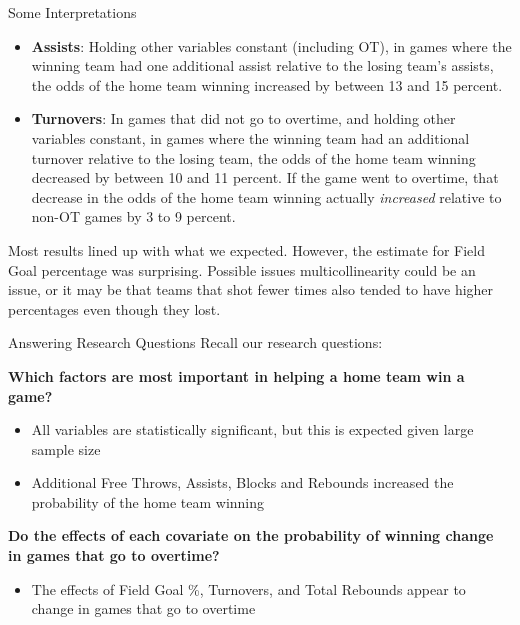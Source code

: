\documentclass{beamer}
\begin{document}
\begin{frame}{Some Interpretations}
 
\begin{itemize}
	\item \textbf{Assists}: Holding other variables constant (including OT), in games where the winning team had one additional assist relative to the losing team's assists, the odds of the home team winning increased by between 13 and 15 percent. 
	\item \textbf{Turnovers}: In games that did not go to overtime, and holding other variables constant, in games where the winning team had an additional turnover relative to the losing team, the odds of the home team winning decreased by between 10 and 11 percent. If the game went to overtime, that decrease in the odds of the home team winning actually \textit{increased} relative to non-OT games by 3 to 9 percent. 
	

\end{itemize}
Most results lined up with what we expected. However, the estimate for Field Goal percentage was surprising. Possible issues multicollinearity could be an issue, or it may be that teams that shot fewer times also tended to have higher percentages even though they lost.  


\end{frame}
	
	
	
\begin{frame}{Answering Research Questions}
Recall our research questions: 

\textbf{Which factors are most important in helping a home team win a game?}
\begin{itemize}
	\item All variables are statistically significant, but this is expected given large sample size
	\item Additional Free Throws, Assists, Blocks and Rebounds increased the probability of the home team winning
	\end{itemize}
		
\textbf{Do the effects of each covariate on the probability of winning change in games that go to overtime?}
\begin{itemize}
	\item The effects of Field Goal \%, Turnovers, and Total Rebounds appear to change in games that go to overtime
\end{itemize}



\end{frame}	
\end{document}
